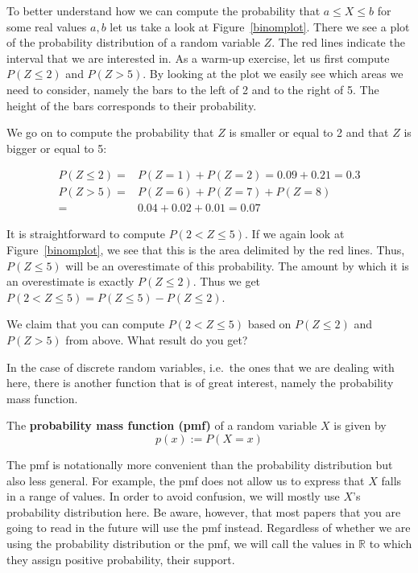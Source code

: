 \documentclass[a4paper,11pt,leqno]{report}
\begin{document}
To better understand how we can compute the probability that $ a \leq X \leq b $ for some real values $ a,b $ let us take a 
look at Figure~\ref{binomplot}. There we see a plot of the probability distribution of a random variable $ Z $. The red lines
indicate the interval that we are interested in. As a warm-up exercise, let us first compute $ P(Z \leq 2) $ and 
$ P(Z > 5) $. By looking at the plot we easily see which areas we need to consider, namely the bars to the left of 2
and to the right of 5. The height of the bars corresponds to their probability. 

We go on to compute the probability that $ Z $ is smaller or equal to 2 and that $ Z $ is bigger or equal to 5:

\begin{align}
P(Z \leq 2) =& P(Z=1) + P(Z=2) = 0.09 + 0.21 = 0.3 \\
P(Z > 5) =& P(Z=6) + P(Z=7) + P(Z=8) \\ 
=& 0.04 + 0.02 + 0.01 = 0.07 \nonumber
\end{align} 

It is straightforward to compute $ P(2 < Z \leq 5) $. If we again look at Figure~\ref{binomplot}, we see that this is
the area delimited by the red lines. Thus, $ P(Z \leq 5) $ will be an overestimate of this probability. The amount by
which it is an overestimate is exactly $ P(Z \leq 2) $. Thus we get $ P(2 < Z \leq 5) = P(Z \leq 5) - P(Z \leq 2) $.

\begin{Exercise}
We claim that you can compute $ P(2 < Z \leq 5) $ based on $ P(Z \leq 2) $ and $ P(Z > 5) $ from above. What result do
you get?
\end{Exercise}

In the case of discrete random variables, i.e.\ the ones that we are dealing with here, there is another function that is of great interest, namely the probability mass function.

\begin{Definition}
The \textbf{probability mass function (pmf)} of a random variable $ X $ is given by
$$ p(x) := P(X = x) $$
\end{Definition}

The pmf is notationally more convenient than the probability distribution but also less general. For example, the pmf does not
allow us to express that $ X $ falls in a range of values. In order to avoid confusion, we will mostly use $ X $'s 
probability distribution here. Be aware, however, that most papers that you are going to read in the future will use the pmf
instead. Regardless of whether we are using the probability distribution or the pmf, we will call the values in $ \mathbb{R} $
to which they assign positive probability, their support.
\end{document}
